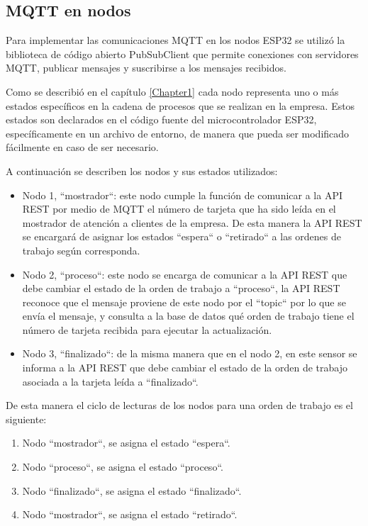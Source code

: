 \subsection{MQTT en nodos}
\label{subsec:mqttnodos}
Para implementar las comunicaciones MQTT en los nodos ESP32 se utilizó la biblioteca de código abierto PubSubClient \citep{WEBSITE:pubsubclient} que permite conexiones con servidores MQTT, publicar mensajes y suscribirse a los mensajes recibidos.

Como se describió en el capítulo \ref{Chapter1} cada nodo representa uno o más estados específicos en la cadena de procesos que se realizan en la empresa. Estos estados son declarados en el código fuente del microcontrolador ESP32, específicamente en un archivo de entorno, de manera que pueda ser modificado fácilmente en caso de ser necesario.

A continuación se describen los nodos y sus estados utilizados:

\begin{itemize}
\item Nodo 1, ``mostrador``: este nodo cumple la función de comunicar a la API REST por medio de MQTT el número de tarjeta que ha sido leída en el mostrador de atención a clientes de la empresa. De esta manera la API REST se encargará de asignar los estados ``espera`` o ``retirado`` a las ordenes de trabajo según corresponda.

\item Nodo 2, ``proceso``: este nodo se encarga de comunicar a la API REST que debe cambiar el estado de la orden de trabajo a ``proceso``, la API REST reconoce que el mensaje proviene de este nodo por el ``topic`` por lo que se envía el mensaje, y consulta a la base de datos qué orden de trabajo tiene el número de tarjeta recibida para ejecutar la actualización.

\item Nodo 3, ``finalizado``: de la misma manera que en el nodo 2, en este sensor se informa a la API REST que debe cambiar el estado de la orden de trabajo asociada a la tarjeta leída a ``finalizado``.
\end{itemize}

De esta manera el ciclo de lecturas de los nodos para una orden de trabajo es el siguiente: 

\begin{enumerate}
\item Nodo ``mostrador``, se asigna el estado ``espera``.
\item Nodo ``proceso``, se asigna el estado ``proceso``.
\item Nodo ``finalizado``, se asigna el estado ``finalizado``.
\item Nodo ``mostrador``, se asigna el estado ``retirado``.
\end{enumerate}

